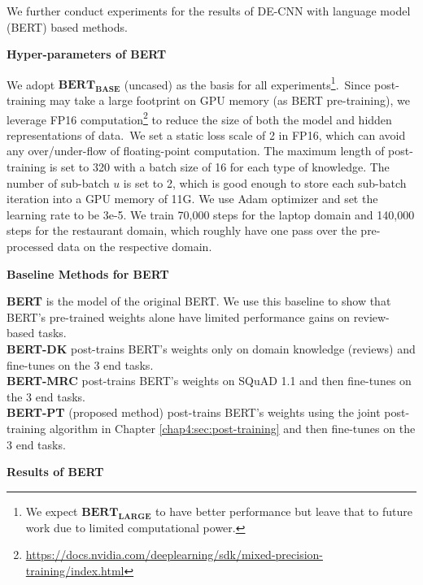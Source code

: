 We further conduct experiments for the results of DE-CNN with language model (BERT) based methods.

\textbf{Hyper-parameters of BERT}
\label{chap6:sec:hyp}

We adopt $\textbf{BERT}_\textbf{BASE}$ (uncased) as the basis for all experiments\footnote{We expect $\textbf{BERT}_\textbf{LARGE}$ to have better performance but leave that to future work due to limited computational power.}.~Since post-training may take a large footprint on GPU memory (as BERT pre-training), we leverage FP16 computation\footnote{\url{https://docs.nvidia.com/deeplearning/sdk/mixed-precision-training/index.html}} to reduce the size of both the model and hidden representations of data.~We set a static loss scale of 2 in FP16, which can avoid any over/under-flow of floating-point computation.
The maximum length of post-training is set to 320 with a batch size of 16 for each type of knowledge. The number of sub-batch $u$ is set to 2, which is good enough to store each sub-batch iteration into a GPU memory of 11G. We use Adam optimizer and set the learning rate to be 3e-5.
We train 70,000 steps for the laptop domain and 140,000 steps for the restaurant domain, which roughly have one pass over the pre-processed data on the respective domain.

\textbf{Baseline Methods for BERT}

\textbf{BERT} is the model of the original BERT. We use this baseline to show that BERT's pre-trained weights alone have limited performance gains on review-based tasks.\\
\textbf{BERT-DK} post-trains BERT's weights only on domain knowledge (reviews) and fine-tunes on the 3 end tasks.\\
\textbf{BERT-MRC} post-trains BERT's weights on SQuAD 1.1 and then fine-tunes on the 3 end tasks.\\
\textbf{BERT-PT} (proposed method) post-trains BERT's weights using the joint post-training algorithm in Chapter \ref{chap4:sec:post-training} and then fine-tunes on the 3 end tasks.

\textbf{Results of BERT}

